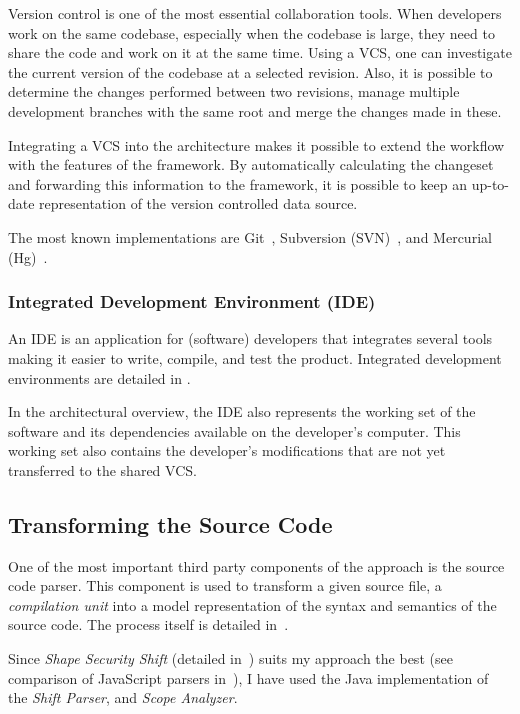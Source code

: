 Version control is one of the most essential collaboration tools. When developers work on the same codebase, especially when the codebase is large, they need to share the code and work on it at the same time. Using a VCS, one can investigate the current version of the codebase at a selected revision. Also, it is possible to determine the changes performed between two revisions, manage multiple development branches with the same root and merge the changes made in these.

Integrating a VCS into the architecture makes it possible to extend the workflow with the features of the framework. By automatically calculating the changeset and forwarding this information to the framework, it is possible to keep an up-to-date representation of the version controlled data source.

The most known implementations are Git~\cite{git}, Subversion (SVN)~\cite{svn}, and Mercurial (Hg)~\cite{hg}.

\subsubsection{Integrated Development Environment (IDE)}
An IDE is an application for (software) developers that integrates several tools making it easier to write, compile, and test the product. Integrated development environments are detailed in .

In the architectural overview, the IDE also represents the working set of the software and its dependencies available on the developer's computer. This working set also contains the developer's modifications that are not yet transferred to the shared VCS.


\subsection{Transforming the Source Code}
\label{sect:overview-transforming-the-source-code}
One of the most important third party components of the approach is the source code parser. This component is used to transform a given source file, a \emph{compilation unit} into a model representation of the syntax and semantics of the source code. The process itself is detailed in~.

Since \emph{Shape Security Shift} (detailed in~) suits my approach the best (see comparison of JavaScript parsers in~), I have used the Java implementation of the \emph{Shift Parser}, and \emph{Scope Analyzer}.


